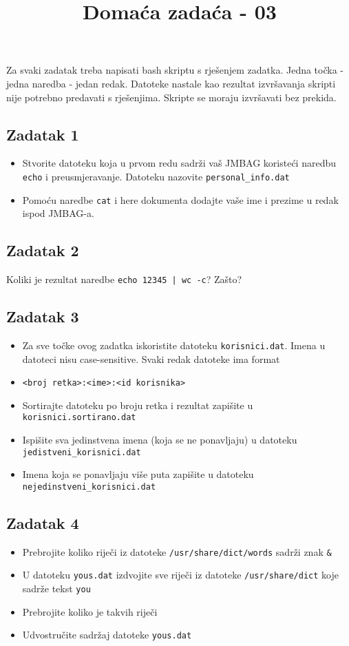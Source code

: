\documentclass[12pt,a4paper]{article}
\newcommand{\shell}[1]{\texttt{#1}}
\begin{document}
  \title{Domaća zadaća - 03\vspace{-2em}}
  \maketitle
  Za svaki zadatak treba napisati bash skriptu s rješenjem zadatka. Jedna točka - jedna naredba - jedan redak. Datoteke nastale kao rezultat izvršavanja skripti nije potrebno predavati s rješenjima. Skripte se moraju izvršavati bez prekida.
  \subsection*{Zadatak 1}
  \begin{itemize}
    \item Stvorite datoteku koja u prvom redu sadrži vaš JMBAG koristeći naredbu \texttt{echo} i preusmjeravanje. Datoteku nazovite \texttt{personal\_info.dat}
    \item Pomoću naredbe \texttt{cat} i here dokumenta dodajte vaše ime i prezime u redak ispod JMBAG-a.
  \end{itemize}
  \subsection*{Zadatak 2}
  Koliki je rezultat naredbe \shell{echo 12345 | wc -c}? Zašto?
  \subsection*{Zadatak 3}
  \begin{itemize}
    \item[] Za sve točke ovog zadatka iskoristite datoteku \texttt{korisnici.dat}. Imena u datoteci nisu case-sensitive. Svaki redak datoteke ima format
    \item[] \texttt{<broj retka>:<ime>:<id korisnika>}
    \item Sortirajte datoteku po broju retka i rezultat zapišite u \texttt{korisnici.sortirano.dat}
    \item Ispišite sva jedinstvena imena (koja se ne ponavljaju) u datoteku\\\texttt{jedistveni\_korisnici.dat}
    \item Imena koja se ponavljaju više puta zapišite u datoteku\\\texttt{nejedinstveni\_korisnici.dat}
  \end{itemize}
  \subsection*{Zadatak 4}
  \begin{itemize}
  	\item Prebrojite koliko riječi iz datoteke \texttt{/usr/share/dict/words} sadrži znak \texttt{\&}
  	\item U datoteku \texttt{yous.dat} izdvojite sve riječi iz datoteke \texttt{/usr/share/dict} koje sadrže tekst \texttt{you}
  	\item Prebrojite koliko je takvih riječi
  	\item Udvostručite sadržaj datoteke \texttt{yous.dat}
  \end{itemize}
\end{document}
